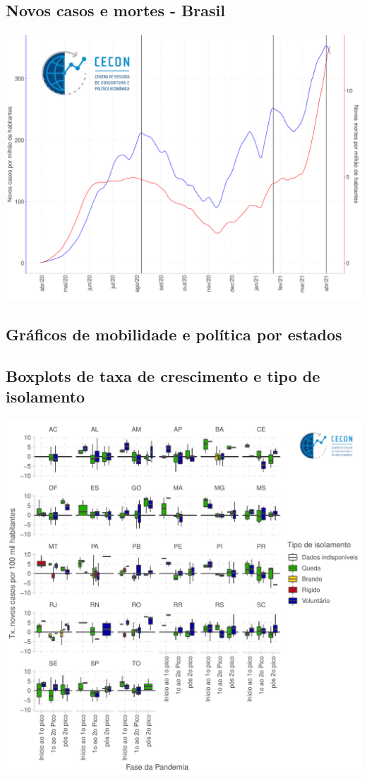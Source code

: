 \documentclass{SelfArx}
\begin{document}
\subsection*{Novos casos e mortes - Brasil}
\label{sec:org3c7e863}


\begin{center}
\includegraphics[width=.9\linewidth]{./figs/COVID/Estados/Brasil.pdf}
\end{center}

\subsection*{Gráficos de mobilidade e política por estados}
\label{sec:org6e39568}

\subsection*{Boxplots de taxa de crescimento e tipo de isolamento}
\label{sec:org7ba84af}

\begin{center}
\includegraphics[width=.9\linewidth]{./figs/COVID/Estados/Boxplot_Isolamento.pdf}
\end{center}
\end{document}
